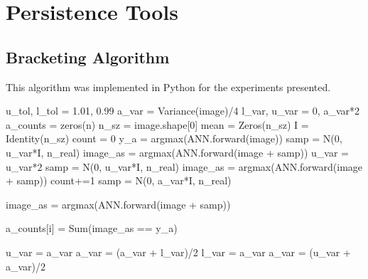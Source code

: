 \chapter{Persistence Tools}

\section{Bracketing Algorithm}\label{bracketing}
This algorithm was implemented in Python for the experiments presented. 

\begin{algorithm}
\begin{algorithmic}
 \State u\_tol, l\_tol = 1.01, 0.99
 \State a\_var = Variance(image)/4 
 \State l\_var, u\_var  = 0, a\_var*2
 \State a\_counts = zeros(n)
 \State n\_sz = image.shape[0]
 \State mean = Zeros(n\_sz)
 \State I = Identity(n\_sz)
 \State count = 0
\State y\_a = argmax(ANN.forward(image))
\State samp = N(0, u\_var*I, n\_real)
\State image\_as = argmax(ANN.forward(image + samp))
\State u\_var = u\_var*2
\State samp = N(0, u\_var*I, n\_real)
\State image\_as = argmax(ANN.forward(image + samp))
\EndWhile
\State count+=1
\State samp = N(0, a\_var*I, n\_real)

\State image\_as = argmax(ANN.forward(image + samp))

\State a\_counts[i] = Sum(image\_as == y\_a)


     
        \State u\_var = a\_var
        \State a\_var = (a\_var + l\_var)/2
     
        \State l\_var = a\_var
        \State a\_var = (u\_var + a\_var)/2
        \EndIf
\EndFor

\EndFunction
\end{algorithmic}
\end{algorithm}

